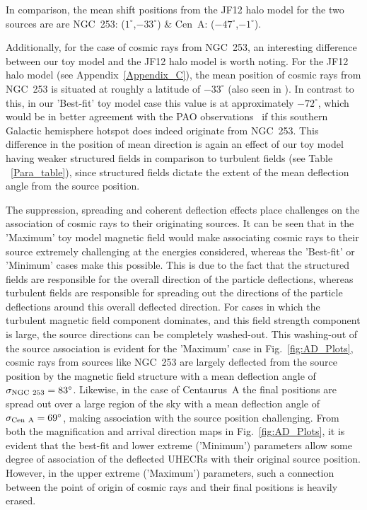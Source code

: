 \documentclass[usenatbib]{mnras}
\begin{document}
In comparison, the mean shift positions from the JF12 halo model for the two sources are are  NGC~253: ($1^{\circ}$,$-33^{\circ}$) \& Cen~A: ($-47^{\circ}$,$-1^{\circ}$).

Additionally, for the case of cosmic rays from NGC~253, an interesting difference between our toy model and the JF12 halo model is worth noting. For the JF12 halo model (see Appendix~\ref{Appendix_C}), the mean position of cosmic rays from NGC~253 is situated at roughly a latitude of $-33^{\circ}$ (also seen in \citet{Arjen_2021}). In contrast to this, in our 'Best-fit' toy model case this value is at approximately $-72^{\circ}$, which would be in better agreement with the PAO observations~\citep{Auger_Starburst2018} if this southern Galactic hemisphere hotspot does indeed originate from NGC~253. This difference in the position of mean direction is again an effect of our toy model having weaker structured fields in comparison to turbulent fields (see Table ~\ref{Para_table}), since structured fields dictate the extent of the mean deflection angle from the source position. 

The suppression, spreading and coherent deflection effects place challenges on the association of cosmic rays to their originating sources. It can be seen that in the 'Maximum' toy model magnetic field would make associating cosmic rays to their source extremely challenging at the energies considered, whereas the 'Best-fit' or 'Minimum' cases make this possible. This is due to the fact that the structured fields are responsible for the overall direction of the particle deflections, whereas turbulent fields are responsible for spreading out the directions of the particle deflections around this overall deflected direction. For cases in which the turbulent magnetic field component dominates, and this field strength component is large, the source directions can be completely washed-out. This washing-out of the source association is evident for the 'Maximum' case in Fig.~\ref{fig:AD_Plots}, cosmic rays from sources like NGC~253 are largely deflected from the source position by the magnetic field structure with a mean deflection angle of $\sigma_{\rm NGC~253} = 83^{\circ}$. Likewise, in the case of Centaurus~A the final positions are spread out over a large region of the sky with a mean deflection angle of $\sigma_{\rm Cen~A} = 69^{\circ}$, making association with the source position challenging. From both the magnification and arrival direction maps in Fig.~\ref{fig:AD_Plots}, it is evident that the best-fit and lower extreme ('Minimum') parameters allow some degree of association of the deflected UHECRs with their original source position. However, in the upper extreme ('Maximum') parameters, such a connection between the point of origin of cosmic rays and their final positions is heavily erased. 
\end{document}
